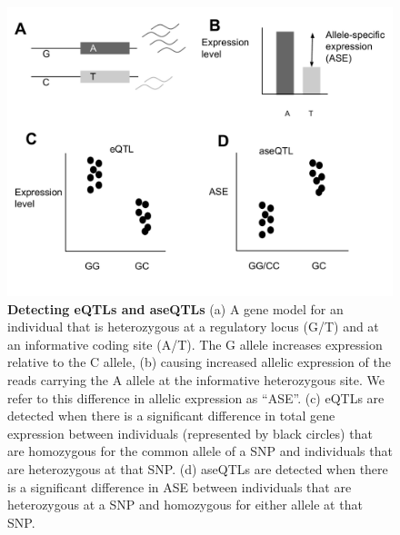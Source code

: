 \begin{figure}[!h]
      \centering
       \includegraphics[width=\linewidth]{Ch3Fig1}
    \caption{\textbf{Detecting eQTLs and aseQTLs} (a) A gene model for an individual that is heterozygous at a regulatory locus (G/T) and at an informative coding site (A/T). The G allele increases expression relative to the C allele, (b) causing increased allelic expression of the reads carrying the A allele at the informative heterozygous site. We refer to this difference in allelic expression as “ASE”. (c) eQTLs are detected when there is a significant difference in total gene expression between individuals (represented by black circles) that are homozygous for the common allele of a SNP and individuals that are heterozygous at that SNP. (d) aseQTLs are detected when there is a significant difference in ASE between individuals that are heterozygous at a SNP and homozygous for either allele at that SNP.}
    \label{fig:3fig1}
\end{figure}



